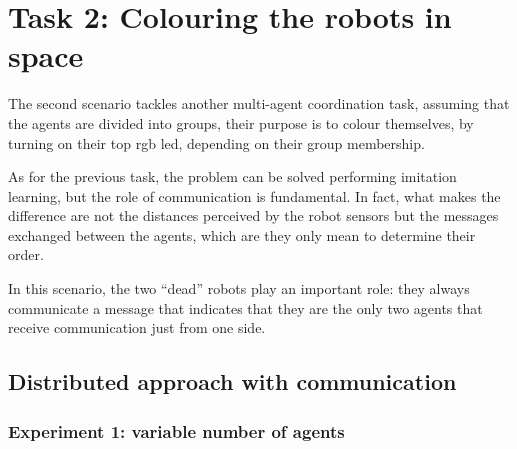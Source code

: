 \section{Task 2: Colouring the robots in space}
\label{sec:task2}

The second scenario tackles another multi-agent coordination task, assuming that 
the agents are divided into groups, their purpose is to colour themselves, by 
turning on their top \gls{rgb} \gls{led}, depending on their group membership. 

As for the previous task, the problem can be solved performing imitation 
learning, but the role of communication is fundamental. In fact, what makes the 
difference are not the distances perceived by the robot sensors but the messages 
exchanged between the agents, which are they only mean to determine their 
order. 

In this scenario, the two ``dead'' robots play an important role: they always 
communicate a message that indicates that they are the only two agents that 
receive communication just from one side.

\subsection{Distributed approach with communication}
\label{subsec:task2-exp-comm}


\subsubsection{Experiment 1: variable number of agents}
\label{subsubsec:task2-exp-comm-1}


